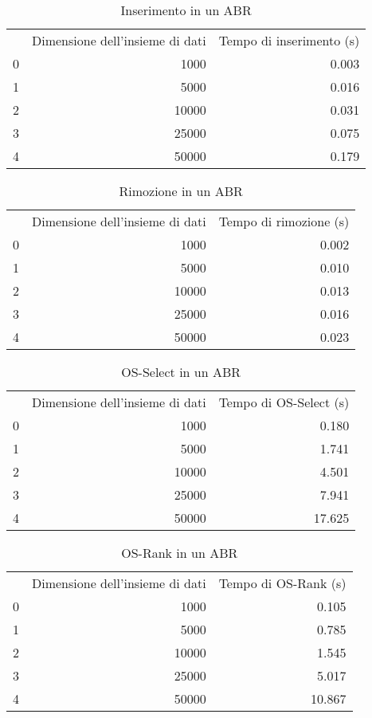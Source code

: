 \begin{table}
\centering
\caption{Inserimento in un ABR}
\label{Inserimento in un ABR}
\begin{tabular}{rrr}
 & Dimensione dell'insieme di dati & Tempo di inserimento (s) \\
0 & 1000 & 0.003 \\
\cline{1-3}
1 & 5000 & 0.016 \\
\cline{1-3}
2 & 10000 & 0.031 \\
\cline{1-3}
3 & 25000 & 0.075 \\
\cline{1-3}
4 & 50000 & 0.179 \\
\cline{1-3}
\end{tabular}
\end{table}

\begin{table}
\centering
\caption{Rimozione in un ABR}
\label{Rimozione in un ABR}
\begin{tabular}{rrr}
 & Dimensione dell'insieme di dati & Tempo di rimozione (s) \\
0 & 1000 & 0.002 \\
\cline{1-3}
1 & 5000 & 0.010 \\
\cline{1-3}
2 & 10000 & 0.013 \\
\cline{1-3}
3 & 25000 & 0.016 \\
\cline{1-3}
4 & 50000 & 0.023 \\
\cline{1-3}
\end{tabular}
\end{table}

\begin{table}
\centering
\caption{OS-Select in un ABR}
\label{OS-Select in un ABR}
\begin{tabular}{rrr}
 & Dimensione dell'insieme di dati & Tempo di OS-Select (s) \\
0 & 1000 & 0.180 \\
\cline{1-3}
1 & 5000 & 1.741 \\
\cline{1-3}
2 & 10000 & 4.501 \\
\cline{1-3}
3 & 25000 & 7.941 \\
\cline{1-3}
4 & 50000 & 17.625 \\
\cline{1-3}
\end{tabular}
\end{table}

\begin{table}
\centering
\caption{OS-Rank in un ABR}
\label{OS-Rank in un ABR}
\begin{tabular}{rrr}
 & Dimensione dell'insieme di dati & Tempo di OS-Rank (s) \\
0 & 1000 & 0.105 \\
\cline{1-3}
1 & 5000 & 0.785 \\
\cline{1-3}
2 & 10000 & 1.545 \\
\cline{1-3}
3 & 25000 & 5.017 \\
\cline{1-3}
4 & 50000 & 10.867 \\
\cline{1-3}
\end{tabular}
\end{table}

